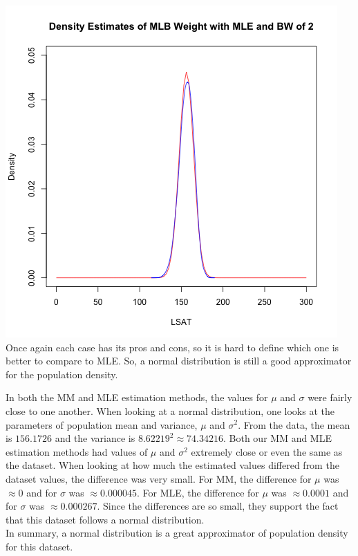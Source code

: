 \documentclass[12pt, letterpaper]{article}
\begin{document}
\includegraphics[scale=0.85]{Lawschool_LSAT_Density_mlebw} \\
Once again each case has its pros and cons, so it is hard to define which one is better to compare to MLE. So, a normal distribution is still a good approximator for the population density. 

\newpage
\noindent
In both the MM and MLE estimation methods, the values for $\mu$ and $\sigma$ were fairly close to one another. When looking at a normal distribution, one looks at the parameters of population mean and variance, $\mu$ and $\sigma^2$. From the data, the mean is $156.1726$ and the variance is $ 8.62219^2 \approx 74.34216$. Both our MM and MLE estimation methods had values of $\mu$ and $\sigma^2$ extremely close or even the same as the dataset. When looking at how much the estimated values differed from the dataset values, the difference was very small. For MM, the difference for $\mu$ was $\approx 0$ and for $\sigma$ was $\approx 0.000045$. For MLE, the difference for $\mu$ was $\approx 0.0001$ and for $\sigma$ was $\approx 0.000267$. Since the differences are so small, they support the fact that this dataset follows a normal distribution. \\
In summary, a normal distribution is a great approximator of population density for this dataset.  

\newpage
\noindent
\end{document}

